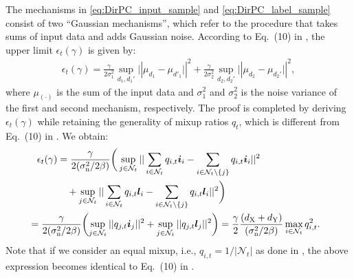 \documentclass[conference,10pt]{IEEEtran}
\theoremstyle{definition}
\theoremstyle{definition}
\begin{document}
The mechanisms in \eqref{eq:DirPC_input_sample} and \eqref{eq:DirPC_label_sample} consist of two ``Gaussian mechanisms'', which refer to the procedure that takes sums of input data and adds Gaussian noise.
According to Eq.~(10) in \cite{lee2019synthesizing}, the upper limit $\epsilon_t(\gamma)$ is given by:
\begingroup
\footnotesize
\begin{align*}
	\label{eq:epsilon_gamma}
	\epsilon_t(\gamma) = \frac{\gamma}{2\sigma_1^2}\sup_{d_1, d_1'} \vert|\mu_{d_1} - \mu_{d'_1}\vert|^2 + \frac{\gamma}{2\sigma_2^2}\sup_{d_2, d_2'} \vert|\mu_{d_2} - \mu_{d_2'}\vert|^2,
\end{align*}
\endgroup
where $\mu_{(\cdot)}$ is the sum of the input data and $\sigma^2_1$ and $\sigma^2_2$ is the noise variance of the first and second mechanism, respectively.
The proof is completed by deriving $\epsilon_t(\gamma)$ while retaining the generality of mixup ratios $q_t$, which is different from Eq.~(10) in \cite{lee2019synthesizing}.
We obtain:
\begingroup
\footnotesize
\begin{align*}
	\epsilon_t(\gamma) & = \frac{\gamma}{2(\sigma^2_{\mathrm{n}}/2\beta)} \bigg(\sup_{j\in\mathcal{N}_t} \vert|\sum_{i\in\mathcal{N}_t} q_{i, t}\bm{i}_i - \sum_{i\in\mathcal{N}_t\setminus\{j\}} q_{i, t}\bm{i}_i\vert|^2 \\
	                   & \quad +  \sup_{j\in\mathcal{N}_t} \vert|\sum_{i\in\mathcal{N}_t} q_{i, t}\bm{l}_i - \sum_{i\in\mathcal{N}_t\setminus\{j\}} q_{i, t}\bm{l}_i\vert|^2\bigg)                                         \\
	                   & \hspace{-3em}= \frac{\gamma}{2(\sigma^2_{\mathrm{n}}/2\beta)} \biggl(\sup_{j\in\mathcal{N}_t}\vert|q_{j, t}\bm{i}_j\vert|^2 + \sup_{j\in\mathcal{N}_t}\vert|q_{j, t}\bm{l}_j\vert|^2\biggr)
	=\frac{\gamma}{2} \frac{(d_{\mathrm{X}} + d_{\mathrm{Y}})}{(\sigma^2_{\mathrm{n}}/2\beta)}\max_{i\in\mathcal{N}_t}q^2_{i, t}.
\end{align*}
\endgroup
Note that if we consider an equal mixup, i.e., $q_{i, t} = 1/|\mathcal{N}_t|$ as done in \cite{lee2019synthesizing}, the above expression becomes identical to Eq.~(10) in \cite{lee2019synthesizing}.
\end{document}
